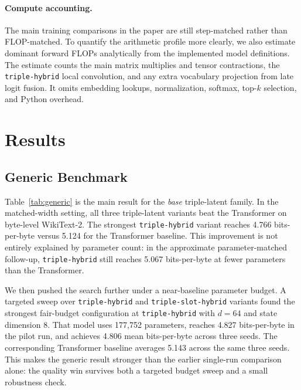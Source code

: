 \documentclass[11pt]{article}
\begin{document}
\paragraph{Compute accounting.}
The main training comparisons in the paper are still step-matched rather than
FLOP-matched. To quantify the arithmetic profile more clearly, we also estimate
dominant forward FLOPs analytically from the implemented model definitions.
The estimate counts the main matrix multiplies and tensor contractions, the
\texttt{triple-hybrid} local convolution, and any extra vocabulary projection
from late logit fusion. It omits embedding lookups, normalization, softmax,
top-$k$ selection, and Python overhead.

\section{Results}
\subsection{Generic Benchmark}
Table~\ref{tab:generic} is the main result for the \emph{base} triple-latent
family. In the matched-width setting, all three triple-latent variants beat the
Transformer on byte-level WikiText-2. The strongest \texttt{triple-hybrid}
variant reaches 4.766 bits-per-byte versus 5.124 for the Transformer baseline.
This improvement is not entirely explained by parameter count: in the
approximate parameter-matched follow-up, \texttt{triple-hybrid} still reaches
5.067 bits-per-byte at fewer parameters than the Transformer.

We then pushed the search further under a near-baseline parameter budget.
A targeted sweep over \texttt{triple-hybrid} and \texttt{triple-slot-hybrid}
variants found the strongest fair-budget configuration at
\texttt{triple-hybrid} with $d=64$ and state dimension $8$. That model uses
177{,}752 parameters, reaches 4.827 bits-per-byte in the pilot run, and
achieves 4.806 mean bits-per-byte across three seeds. The corresponding
Transformer baseline averages 5.143 across the same three seeds. This makes the
generic result stronger than the earlier single-run comparison alone: the
quality win survives both a targeted budget sweep and a small robustness check.
\end{document}
